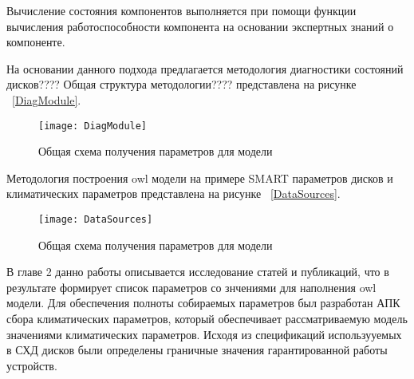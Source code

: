 Вычисление  состояния  компонентов  выполняется  при  помощи функции вычисления работоспособности компонента на основании экспертных знаний о компоненте.

На основании данного подхода предлагается методология диагностики состояний дисков????
Общая структура методологии???? представлена на рисунке ~\ref{DiagModule}.
\begin{figure}[h]
	\centering
	\texttt{[image: DiagModule]}
	\caption{Общая схема получения параметров для модели}
	\label{fig:DiagModule}
\end{figure}

Методология построения owl модели на примере SMART параметров дисков и климатических параметров представлена на рисунке ~\ref{DataSources}.
\begin{figure}[h]
	\centering
	\texttt{[image: DataSources]}
	\caption{Общая схема получения параметров для модели}
	\label{fig:DataSources}
\end{figure}
В главе 2 данно работы описывается исследование статей и публикаций, что в результате формирует список параметров со знчениями для наполнения owl модели. Для обеспечения полноты собираемых параметров был разработан АПК сбора климатических параметров, который обеспечивает рассматриваемую модель значениями климатических параметров. Исходя из спецификаций использууемых в СХД дисков были определены граничные значения гарантированной работы устройств. 